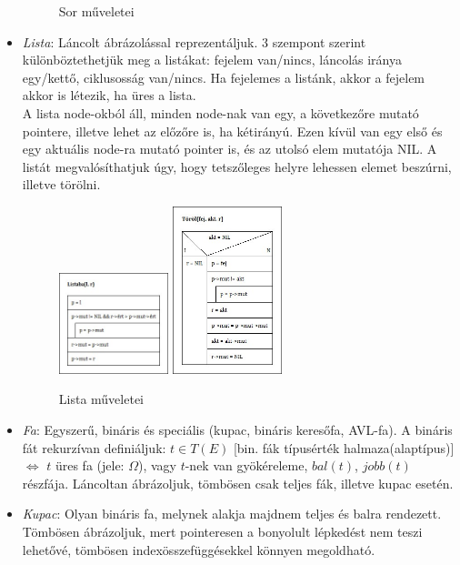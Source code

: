 \documentclass[margin=0px]{article}
\begin{document}
\begin{itemize}
\begin{figure}[H]
			\caption{Sor műveletei}
		\end{figure}
		\item \textit{Lista}: Láncolt ábrázolással reprezentáljuk. 3 szempont szerint különböztethetjük meg a listákat: fejelem van/nincs, láncolás iránya egy/kettő, ciklusosság van/nincs. Ha fejelemes a listánk, akkor a fejelem akkor is létezik, ha üres a lista. \\
		A lista node-okból áll, minden node-nak van egy, a következőre mutató pointere, illetve lehet az előzőre is, ha kétirányú. Ezen kívül van egy első és egy aktuális node-ra mutató pointer is, és az utolsó elem mutatója NIL. A listát megvalósíthatjuk úgy, hogy tetszőleges helyre lehessen elemet beszúrni, illetve törölni.
		\begin{figure}[H]
			\centering
			\includegraphics[width=0.3\textwidth]{img/Listaba.jpg}
			\includegraphics[width=0.3\textwidth]{img/Torol.jpg}
			\caption{Lista műveletei}
		\end{figure}
		\item \textit{Fa}: Egyszerű, bináris és speciális (kupac, bináris keresőfa, AVL-fa). A bináris fát rekurzívan definiáljuk: $t \in T(E)$ [bin. fák típusérték halmaza(alaptípus)] $\iff$ $t$ üres fa (jele: $\Omega$), vagy $t$-nek van gyökéreleme, $bal(t)$, $jobb(t)$ részfája. Láncoltan ábrázoljuk, tömbösen csak teljes fák, illetve kupac esetén.
		\item \textit{Kupac}: Olyan bináris fa, melynek alakja majdnem teljes és balra rendezett. Tömbösen ábrázoljuk, mert pointeresen a bonyolult lépkedést nem teszi lehetővé, tömbösen indexösszefüggésekkel könnyen megoldható.

\end{itemize}
\end{document}
